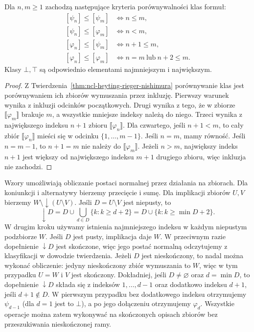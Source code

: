 \begin{stwierdzenie}
\label{prop:ncl-heyting-rn-order}
Dla $n,m\geq1$ zachodzą następujące kryteria
porównywalności klas formuł:
\[
\begin{aligned}
 [\psi_n]\leq[\psi_m]&\iff n\leq m,\\
 [\psi_n]\leq[\varphi_m]&\iff n<m,\\
 [\varphi_n]\leq[\psi_m]&\iff n+1\leq m,\\
 [\varphi_n]\leq[\varphi_m]&\iff n=m\ \text{lub}\ n+2\leq m.
\end{aligned}
\]
Klasy $\bot,\top$ są odpowiednio elementami
najmniejszym i największym.
\end{stwierdzenie}
\begin{proof}
Z Twierdzenia~\ref{thm:ncl-heyting-rieger-nishimura}
porównywanie klas jest porównywaniem ich zbiorów
wymuszania przez inkluzję.
Pierwszy warunek wynika z inkluzji odcinków
początkowych. Drugi wynika z tego, że w zbiorze
$\llbracket\varphi_m\rrbracket$ brakuje $m$,
a wszystkie mniejsze indeksy należą do niego.
Trzeci wynika z największego indeksu $n+1$
zbioru $\llbracket\varphi_n\rrbracket$.
Dla czwartego, jeśli $n+1<m$, to cały zbiór
$\llbracket\varphi_n\rrbracket$ mieści się
w odcinku $\{1,\ldots,m-1\}$.
Jeśli $n=m$, mamy równość.
Jeśli $n=m-1$, to $n+1=m$ nie należy
do $\llbracket\varphi_m\rrbracket$.
Jeżeli $n>m$, największy indeks $n+1$
jest większy od największego indeksu $m+1$
drugiego zbioru, więc inkluzja nie zachodzi.
\end{proof}

Wzory umożliwiają obliczanie postaci normalnej
przez działania na zbiorach.
Dla koniunkcji i alternatywy bierzemy przecięcie
i sumę. Dla implikacji zbiorów $U,V$ bierzemy
$W\setminus\downarrow(U\setminus V)$.
Jeśli $D=U\setminus V$ jest niepusty, to
\[
 \downarrow D
 =D\cup\bigcup_{d\in D}\{k:k\geq d+2\}
 =D\cup\{k:k\geq\min D+2\}.
\]
W drugim kroku używamy istnienia najmniejszego
indeksu w każdym niepustym podzbiorze $W$.
Jeśli $D$ jest pusty, implikacja daje $W$.
W przeciwnym razie dopełnienie $\downarrow D$
jest skończone, więc jego postać normalną
odczytujemy z klasyfikacji w dowodzie twierdzenia.
Jeżeli $D$ jest nieskończony, to nadal można
wykonać obliczenie: jedyny nieskończony zbiór
wymuszania to $W$, więc w tym przypadku
$U=W$ i $V$ jest skończony.
Dokładniej, jeśli $D\ne\varnothing$ oraz
$d=\min D$, to dopełnienie $\downarrow D$
składa się z indeksów $1,\ldots,d-1$
oraz dodatkowo indeksu $d+1$, jeśli $d+1\notin D$.
W pierwszym przypadku bez dodatkowego indeksu
otrzymujemy $\psi_{d-1}$ (dla $d=1$ jest to $\bot$),
a po jego dołączeniu otrzymujemy $\varphi_d$.
Wszystkie operacje można zatem wykonywać
na skończonych opisach zbiorów bez przeszukiwania
nieskończonej ramy.

